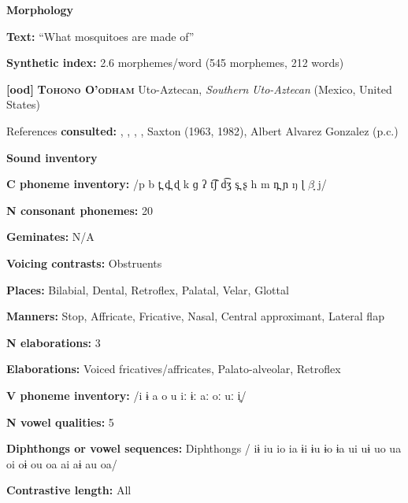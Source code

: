 \textbf{Morphology}



\textbf{Text:} “What mosquitoes are made of” \citep[133-143]{Stonham1999}



\textbf{Synthetic index:} 2.6 morphemes/word (545 morphemes, 212 words)



\textbf{[ood]}   \textbf{\textsc{Tohono O’odham}}  Uto-Aztecan, \textit{Southern} \textit{Uto-Aztecan} (Mexico, United States)



References \textbf{consulted:} \citet{DoloresMathiot1991}, \citet{Fitzgerald1994}, \citet{Hale1959}, \citet{HillZepeda1992}, Saxton (1963, 1982), Albert Alvarez Gonzalez (p.c.)



\textbf{Sound inventory}



\textbf{C phoneme inventory:} /p b t̪ d̪ ɖ k ɡ ʔ t͡ʃ d͡ʒ s̪ ʂ h m n̪ ɲ ŋ ɭ $\beta ̞$ j/



\textbf{N consonant phonemes:} 20



\textbf{Geminates:} N/A



\textbf{Voicing contrasts:} Obstruents



\textbf{Places:} Bilabial, Dental, Retroflex, Palatal, Velar, Glottal



\textbf{Manners:} Stop, Affricate, Fricative, Nasal, Central approximant, Lateral flap



\textbf{N elaborations:} 3



\textbf{Elaborations:} Voiced fricatives/affricates, Palato-alveolar, Retroflex



\textbf{V phoneme inventory:} /i ɨ a o u iː ɨː aː oː uː i̥/



\textbf{N vowel qualities:} 5



\textbf{Diphthongs or vowel sequences:} Diphthongs / iɨ iu io ia ɨi ɨu ɨo ɨa ui uɨ uo ua oi oɨ ou oa ai aɨ au oa/



\textbf{Contrastive length:} All



